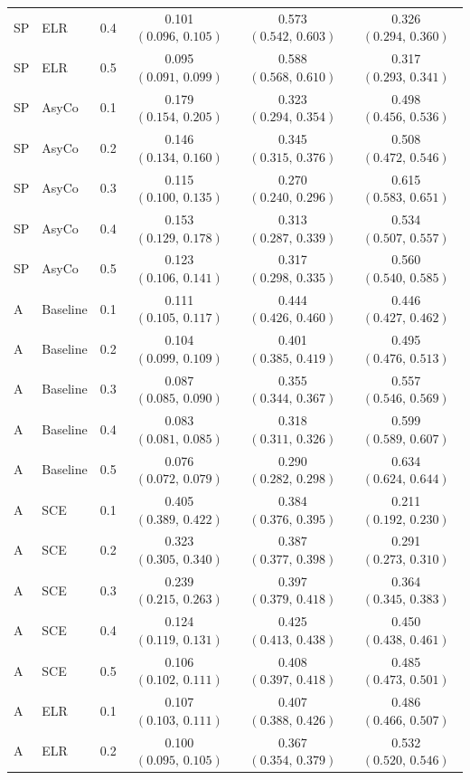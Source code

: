 \begin{small}
\begin{longtable}{lllccc}
SP & ELR & 0.4 & 0.101 $(0.096,\,0.105)$ & 0.573 $(0.542,\,0.603)$ & 0.326 $(0.294,\,0.360)$ \\
SP & ELR & 0.5 & 0.095 $(0.091,\,0.099)$ & 0.588 $(0.568,\,0.610)$ & 0.317 $(0.293,\,0.341)$ \\
SP & AsyCo & 0.1 & 0.179 $(0.154,\,0.205)$ & 0.323 $(0.294,\,0.354)$ & 0.498 $(0.456,\,0.536)$ \\
SP & AsyCo & 0.2 & 0.146 $(0.134,\,0.160)$ & 0.345 $(0.315,\,0.376)$ & 0.508 $(0.472,\,0.546)$ \\
SP & AsyCo & 0.3 & 0.115 $(0.100,\,0.135)$ & 0.270 $(0.240,\,0.296)$ & 0.615 $(0.583,\,0.651)$ \\
SP & AsyCo & 0.4 & 0.153 $(0.129,\,0.178)$ & 0.313 $(0.287,\,0.339)$ & 0.534 $(0.507,\,0.557)$ \\
SP & AsyCo & 0.5 & 0.123 $(0.106,\,0.141)$ & 0.317 $(0.298,\,0.335)$ & 0.560 $(0.540,\,0.585)$ \\
A & Baseline & 0.1 & 0.111 $(0.105,\,0.117)$ & 0.444 $(0.426,\,0.460)$ & 0.446 $(0.427,\,0.462)$ \\
A & Baseline & 0.2 & 0.104 $(0.099,\,0.109)$ & 0.401 $(0.385,\,0.419)$ & 0.495 $(0.476,\,0.513)$ \\
A & Baseline & 0.3 & 0.087 $(0.085,\,0.090)$ & 0.355 $(0.344,\,0.367)$ & 0.557 $(0.546,\,0.569)$ \\
A & Baseline & 0.4 & 0.083 $(0.081,\,0.085)$ & 0.318 $(0.311,\,0.326)$ & 0.599 $(0.589,\,0.607)$ \\
A & Baseline & 0.5 & 0.076 $(0.072,\,0.079)$ & 0.290 $(0.282,\,0.298)$ & 0.634 $(0.624,\,0.644)$ \\
A & SCE & 0.1 & 0.405 $(0.389,\,0.422)$ & 0.384 $(0.376,\,0.395)$ & 0.211 $(0.192,\,0.230)$ \\
A & SCE & 0.2 & 0.323 $(0.305,\,0.340)$ & 0.387 $(0.377,\,0.398)$ & 0.291 $(0.273,\,0.310)$ \\
A & SCE & 0.3 & 0.239 $(0.215,\,0.263)$ & 0.397 $(0.379,\,0.418)$ & 0.364 $(0.345,\,0.383)$ \\
A & SCE & 0.4 & 0.124 $(0.119,\,0.131)$ & 0.425 $(0.413,\,0.438)$ & 0.450 $(0.438,\,0.461)$ \\
A & SCE & 0.5 & 0.106 $(0.102,\,0.111)$ & 0.408 $(0.397,\,0.418)$ & 0.485 $(0.473,\,0.501)$ \\
A & ELR & 0.1 & 0.107 $(0.103,\,0.111)$ & 0.407 $(0.388,\,0.426)$ & 0.486 $(0.466,\,0.507)$ \\
A & ELR & 0.2 & 0.100 $(0.095,\,0.105)$ & 0.367 $(0.354,\,0.379)$ & 0.532 $(0.520,\,0.546)$ \\

\end{longtable}
\end{small}
